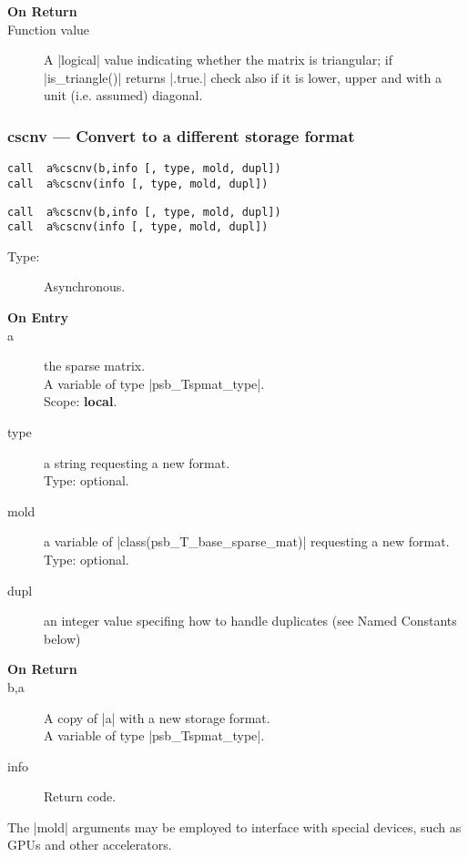 \begin{description}
\item[\bf On Return]
\item[Function value] A \fortinline|logical| value indicating whether the
  matrix is triangular; if \fortinline|is_triangle()| returns \fortinline|.true.|
  check also if it is lower, upper and with a unit (i.e. assumed)
  diagonal. 
\end{description}


\subsubsection{cscnv --- Convert to a different storage format}

\ifpdf
\begin{verbatim}
call  a%cscnv(b,info [, type, mold, dupl])
call  a%cscnv(info [, type, mold, dupl])
\end{verbatim}
\else
\begin{verbatim}
call  a%cscnv(b,info [, type, mold, dupl])
call  a%cscnv(info [, type, mold, dupl])
\end{verbatim}
\fi

\begin{description}
\item[Type:] Asynchronous.
\item[\bf On Entry]
\item[a] the sparse matrix.\\
A variable of type \fortinline|psb_Tspmat_type|.\\
Scope: {\bf local}.\\
\item[type] a string requesting a new format.\\
Type: optional.
\item[mold] a variable of \fortinline|class(psb_T_base_sparse_mat)|  requesting a new format.\\
Type: optional.
\item[dupl] an integer value specifing how to handle duplicates (see
  Named Constants below)
\end{description}

\begin{description}
\item[\bf On Return]
\item[b,a] A copy  of \fortinline|a| with a new storage format.\\
A variable of type \fortinline|psb_Tspmat_type|.
\item[info] Return code. 
\end{description}
The \fortinline|mold|  arguments may be
employed to interface with special devices, such as GPUs and other
accelerators. 


